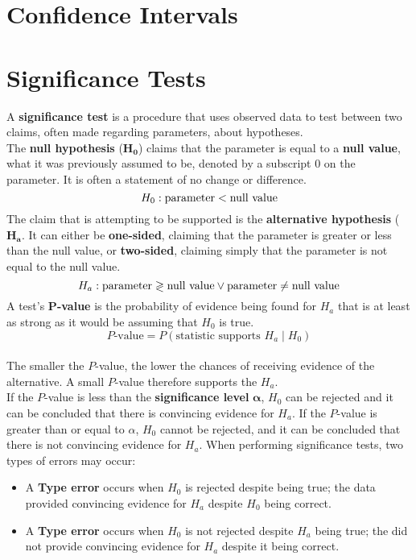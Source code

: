 \documentclass[../AP_Statistics.tex]{subfiles}
\begin{document}
	\chapter{Confidence Intervals}
	\chapter{Significance Tests}
		A \textbf{significance test} is a procedure that uses observed data to test between two claims, often made regarding parameters, about hypotheses. \\
		The \textbf{null hypothesis} ($\pmb{H_0}$) claims that the parameter is equal to a \textbf{null value}, what it was previously assumed to be, denoted by a subscript $0$ on the parameter. It is often a statement of no change or difference.
		$$H_0:\rm{parameter} < \text{null value}$$
		The claim that is attempting to be supported is the \textbf{alternative hypothesis} ($\pmb{H_a}$. It can either be \textbf{one-sided}, claiming that the parameter is greater or less than the null value, or \textbf{two-sided}, claiming simply that the parameter is not equal to the null value.
		$$H_a:\rm{parameter} \gtrless \text{null value} \lor \rm{parameter} \ne \text{null value}$$
		A test's $\pmb{P}$\textbf{-value} is the probability of evidence being found for $H_a$ that is at least as strong as it would be assuming that $H_0$ is true.
		$$P\text{-value} = P(\text{statistic supports } H_a \mid H_0)$$ \\
		The smaller the $P$-value, the lower the chances of receiving evidence of the alternative. A small $P$-value therefore supports the $H_a$. \\
		If the $P$-value is less than the \textbf{significance level} $\pmb{\alpha}$, $H_0$ can be rejected and it can be concluded that there is convincing evidence for $H_a$. If the $P$-value is greater than or equal to $\alpha$, $H_0$ cannot be rejected, and it can be concluded that there is not convincing evidence for $H_a$.
		When performing significance tests, two types of errors may occur:
		\begin{itemize}
			\item
				A \textbf{Type  error} occurs when $H_0$ is rejected despite being true; the data provided convincing evidence for $H_a$ despite $H_0$ being correct. 
			\item
			A \textbf{Type  error} occurs when $H_0$ is not rejected despite $H_a$ being true; the did not provide convincing evidence for $H_a$ despite it being correct.
		\end{itemize}
\end{document}
